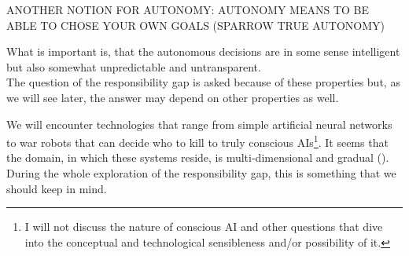 \documentclass{article}
\begin{document}
ANOTHER NOTION FOR AUTONOMY: AUTONOMY MEANS TO BE ABLE TO CHOSE YOUR OWN GOALS
(SPARROW TRUE AUTONOMY)

What is important is, that the autonomous decisions are in some sense
intelligent but also somewhat unpredictable and untransparent.\\

The question of the responsibility gap is asked because of these properties but,
as we will see later, the answer may depend on other properties as well.

We will encounter technologies that range from simple artificial
neural networks to war robots that can decide who to kill to truly conscious AIs\footnote{I will not discuss the nature of
	conscious AI and other questions that dive into the conceptual and
technological sensibleness and/or possibility of it.}. It seems that the domain,
in which these systems reside, is multi-dimensional and gradual (\cite[p.
75]{misselhorn2018grundfragen}). During the whole exploration of the
responsibility gap, this is something that we should keep in mind.\\

%
% 
%
%
%
%
%
%
%
%
%
%
\end{document}
